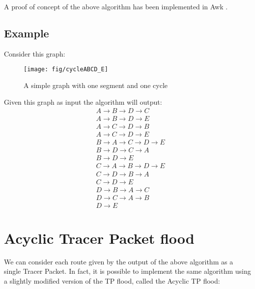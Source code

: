 \documentclass[a4paper]{article}
\begin{document}
A proof of concept of the above algorithm has been implemented in Awk
\cite{genrouteawk}.

\subsection*{Example}
Consider this graph:

\begin{figure}[h]
	\begin{center}
		\texttt{[image: fig/cycleABCD\_E]}
	\end{center}
	\caption{A simple graph with one segment and one cycle}
	\label{fig:gen_route_sample}
\end{figure}

Given this graph as input the algorithm will output:
\label{sec:genroute_output}
\begin{align*}
& A \rightarrow B \rightarrow D \rightarrow C\\
& A \rightarrow B \rightarrow D \rightarrow E\\
& A \rightarrow C \rightarrow D \rightarrow B\\
& A \rightarrow C \rightarrow D \rightarrow E\\
& B \rightarrow A \rightarrow C \rightarrow D \rightarrow E\\
& B \rightarrow D \rightarrow C \rightarrow A\\
& B \rightarrow D \rightarrow E\\
& C \rightarrow A \rightarrow B \rightarrow D \rightarrow E\\
& C \rightarrow D \rightarrow B \rightarrow A\\
& C \rightarrow D \rightarrow E\\
& D \rightarrow B \rightarrow A \rightarrow C\\
& D \rightarrow C \rightarrow A \rightarrow B\\
& D \rightarrow E
\end{align*}

\section{Acyclic Tracer Packet flood}
\label{sec:acyclic_TP_flood}

We can consider each route given by the output of the above algorithm as a
single Tracer Packet.
In fact, it is possible to implement the same algorithm using a slightly
modified version of the TP flood, called the Acyclic TP flood:
\end{document}

